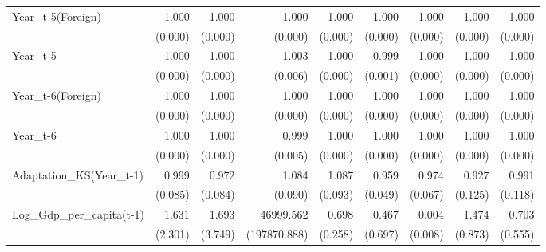 \begin{table}[htbp]
\begin{tabular}{l*{8}{D{.}{.}{-1}}}
Year\_t-5(Foreign)&       1.000\sym{***}&       1.000         &       1.000         &       1.000         &       1.000         &       1.000         &       1.000         &       1.000\sym{*}  \\
            &     (0.000)         &     (0.000)         &     (0.000)         &     (0.000)         &     (0.000)         &     (0.000)         &     (0.000)         &     (0.000)         \\
Year\_t-5    &       1.000\sym{**} &       1.000\sym{*}  &       1.003         &       1.000\sym{\%}  &       0.999         &       1.000         &       1.000         &       1.000         \\
            &     (0.000)         &     (0.000)         &     (0.006)         &     (0.000)         &     (0.001)         &     (0.000)         &     (0.000)         &     (0.000)         \\
Year\_t-6(Foreign)&       1.000\sym{**} &       1.000\sym{***}&       1.000         &       1.000         &       1.000         &       1.000\sym{**} &       1.000         &       1.000         \\
            &     (0.000)         &     (0.000)         &     (0.000)         &     (0.000)         &     (0.000)         &     (0.000)         &     (0.000)         &     (0.000)         \\
Year\_t-6    &       1.000\sym{\%}  &       1.000\sym{*}  &       0.999         &       1.000         &       1.000         &       1.000         &       1.000\sym{*}  &       1.000\sym{\%}  \\
            &     (0.000)         &     (0.000)         &     (0.005)         &     (0.000)         &     (0.000)         &     (0.000)         &     (0.000)         &     (0.000)         \\
Adaptation\_KS(Year\_t-1)&       0.999         &       0.972         &       1.084         &       1.087         &       0.959         &       0.974         &       0.927         &       0.991         \\
            &     (0.085)         &     (0.084)         &     (0.090)         &     (0.093)         &     (0.049)         &     (0.067)         &     (0.125)         &     (0.118)         \\
Log\_Gdp\_per\_capita(t-1)&       1.631         &       1.693         &   46999.562\sym{**} &       0.698         &       0.467         &       0.004\sym{***}&       1.474         &       0.703         \\
            &     (2.301)         &     (3.749)         &(197870.888)         &     (0.258)         &     (0.697)         &     (0.008)         &     (0.873)         &     (0.555)         \\

\end{tabular}
\end{table}
